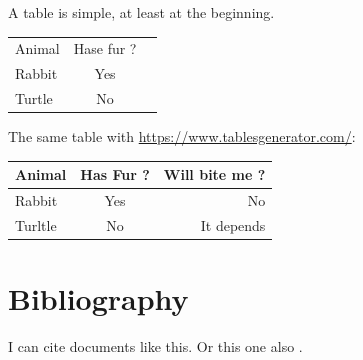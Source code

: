 \documentclass[10pt,a4paper,twoside]{article}
\begin{document}
A table is simple, at least at the beginning.

\begin{center}
  \begin{tabular}{l|cr} %
    \hline %
    Animal & Hase fur ? \\
    Rabbit & Yes        \\
    Turtle & No         \\
    \hline
  \end{tabular}
\end{center}

The same table with \url{https://www.tablesgenerator.com/}: %

\begin{center}
  \begin{tabular}{@{}lcr@{}}
    \toprule
    \textbf{Animal} & \textbf{Has Fur ?} & \textbf{Will bite me ?} \\ \midrule
    Rabbit          & Yes                & No                      \\
    Turltle         & No                 & It depends              \\ \bottomrule
  \end{tabular}
\end{center}


\section{Bibliography}

I can cite \cite{hawking1974black} documents like this.
Or this one also \cite{belczynski2012missing}.



\end{document}
